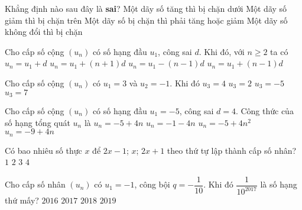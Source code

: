 \begin{ex}%
	Khẳng định nào sau đây là {\bf sai}?	
	\choice
	{Một dãy số tăng thì bị chặn dưới}
	{Một dãy số giảm thì bị chặn trên}
	{\True Một dãy số bị chặn thì phải tăng hoặc giảm}
	{Một dãy số không đổi thì bị chặn}
\end{ex}
\begin{ex}%
	Cho cấp số cộng $(u_n)$ có số hạng đầu $u_1$, công sai $d$. Khi đó, với $n \geq 2$ ta có
	\choice
	{$u_n=u_1+d$}
	{$u_n=u_1+(n+1) d$}
	{$u_n=u_1-(n-1) d$}      
	{\True $u_n=u_1+(n-1) d$}
\end{ex}

\begin{ex}%
	Cho cấp số cộng $(u_n)$ có $u_1=3$ và $u_2=-1$. Khi đó
	\choice
	{$u_3=4$}
	{$u_3=2$}
	{\True $u_3=-5$}
	{$u_3=7$}
\end{ex}
\begin{ex}%
	Cho cấp số cộng $(u_n)$ có số hạng đầu $u_1=-5$, công sai $d=4$. Công thức của số hạng tổng quát $u_n$ là
	\choice
	{$u_n=-5+4n$}
	{$u_n=-1-4n$}
	{$u_n=-5+4n^2$}
	{\True $u_n=-9+4n$}
\end{ex}
\begin{ex}%
	Có bao nhiêu số thực $x$ để $2x-1$; $x$; $2x+1$ theo thứ tự lập thành cấp số nhân?
	\choice 
	{$1$}
	{\True $2$}
	{$3$}
	{$4$}
\end{ex}
\begin{ex}%
	Cho cấp số nhân $(u_n)$ có $u_1=-1$, công bội $q=-\dfrac{1}{10}$. Khi đó $\dfrac{1}{10^{2017}}$ là số hạng thứ mấy?
	\choice
	{$2016$}
	{$2017$}
	{\True $2018$}
	{$2019$}
\end{ex}
